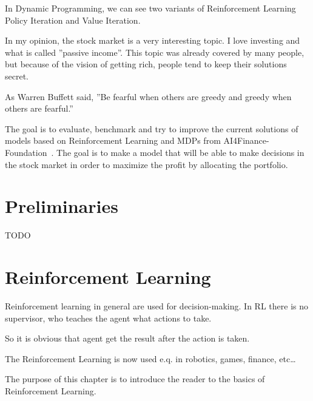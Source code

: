 In Dynamic Programming, we can see two variants of Reinforcement Learning
Policy Iteration and Value Iteration.

In my opinion, the stock market is a very interesting topic.
I love investing and what is called ''passive income''.
This topic was already covered by many people, but because of the
vision of getting rich, people tend to keep their solutions secret.

As Warren Buffett said, ''Be fearful when others are greedy and greedy when others are fearful.''

The goal is to evaluate, benchmark and try to improve the current solutions of models
based on Reinforcement Learning and MDPs from AI4Finance-Foundation~\cite{https://doi.org/10.48550/arxiv.2111.03995}.
The goal is to make a model that will be able to make decisions in the stock market
in order to maximize the profit by allocating the portfolio.





\chapter{Preliminaries}\label{ch:preliminaries}
TODO




\chapter{Reinforcement Learning}\label{ch:reinforcement-learning}
Reinforcement learning in general are used for decision-making.
In RL there is no supervisor, who teaches the agent what actions to take.

So it is obvious that agent get the result after the action is taken.

The Reinforcement Learning is now used e.q. in robotics, games, finance, etc\ldots


The purpose of this chapter is to introduce the reader to the basics of Reinforcement Learning.


